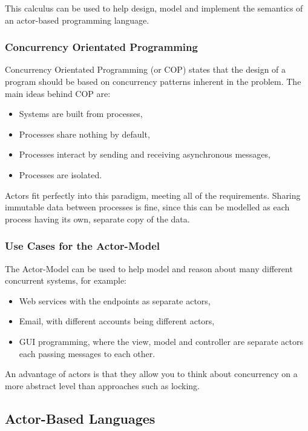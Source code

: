 \documentclass{article}
\begin{document}
This calculus can be used to help design, model and implement the semantics of an actor-based programming language.

\subsubsection{Concurrency Orientated Programming}
Concurrency Orientated Programming\cite{armstrong2007} (or COP) states that the design of a program should be based on concurrency patterns inherent in the problem.
The main ideas behind COP are:
\begin{itemize}
\item Systems are built from processes,
\item Processes share nothing by default,
\item Processes interact by sending and receiving asynchronous messages,
\item Processes are isolated.
\end{itemize}

Actors fit perfectly into this paradigm, meeting all of the requirements.
Sharing immutable data between processes is fine, since this can be modelled as each process having its own, separate copy of the data.

\subsubsection{Use Cases for the Actor-Model}

The Actor-Model can be used to help model and reason about many different concurrent systems, for example:

\begin{itemize}[noitemsep]
\item Web services with the endpoints as separate actors,
\item Email, with different accounts being different actors,
\item GUI programming, where the view, model and controller are separate actors 	 each passing messages to each other.
\end{itemize}

An advantage of actors is that they allow you to think about concurrency on a more abstract level than approaches such as locking.

\subsection{Actor-Based Languages}
\end{document}

